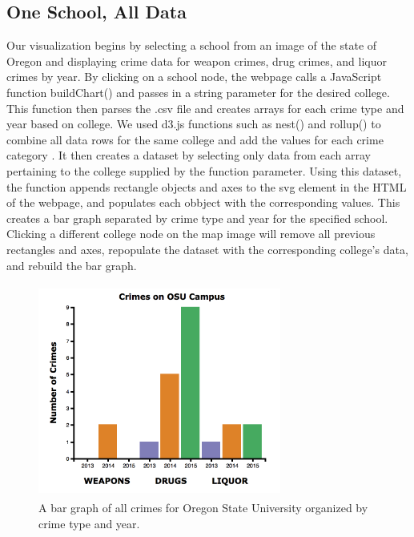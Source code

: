 \documentclass[journal]{vgtc}                %
\begin{document}
\subsection{One School, All Data}
Our visualization begins by selecting a school from an image of the state of Oregon and displaying crime data for weapon crimes, drug crimes, and liquor crimes by year. By clicking on a school node, the webpage calls a JavaScript function buildChart() and passes in a string parameter for the desired college. This function then parses the .csv file and creates arrays for each crime type and year based on college. We used d3.js functions such as nest() and rollup() to combine all data rows for the same college and add the values for each crime category \cite{d3API}.
It then creates a dataset by selecting only data from each array pertaining to the college supplied by the function parameter. Using this dataset, the function appends rectangle objects and axes to the svg element in the HTML of the webpage, and populates each obbject with the corresponding values. This creates a bar graph separated by crime type and year for the specified school. Clicking a different college node on the map image will remove all previous rectangles and axes, repopulate the dataset with the corresponding college's data, and rebuild the bar graph. 
\begin{figure}[h]
\label{fig:OneSchoolAllData}
\centering
\includegraphics[width=8cm, height=7cm]{OneSchoolAllData}
\caption{A bar graph of all crimes for Oregon State University organized by crime type and year.}
\end{figure}
\end{document}
